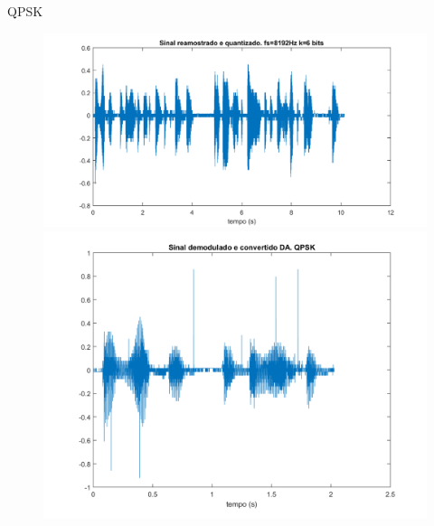 ﻿\documentclass[mathserif]{beamer}
\begin{document}
	\begin{frame}{QPSK}
		\begin{figure}
			\centering
			\includegraphics[scale=0.3]{../NossoCodigo2/figuras/0quantizado.png}
			\quad
			\includegraphics[scale=0.3]{../NossoCodigo2/figuras/modula14.png}
		\end{figure}
	\end{frame}
\end{document}
